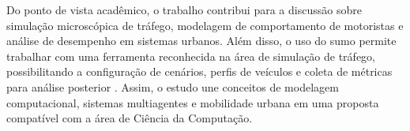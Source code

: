 Do ponto de vista acadêmico, o trabalho contribui para a discussão sobre simulação microscópica de tráfego, modelagem de comportamento de motoristas e análise de desempenho em sistemas urbanos. Além disso, o uso do \gls{sumo} permite trabalhar com uma ferramenta reconhecida na área de simulação de tráfego, possibilitando a configuração de cenários, perfis de veículos e coleta de métricas para análise posterior \cite{lopez_2018}. Assim, o estudo une conceitos de modelagem computacional, sistemas multiagentes e mobilidade urbana em uma proposta compatível com a área de Ciência da Computação.

